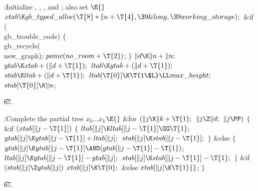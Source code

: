 \B{}:Initialize , , , and ; also set \X${}\E{}$\6
$\\{xtab}\K\\{gb\_typed\_alloc}(\T{8}*\|n+\T{4},\39\&{long},\39\\{working%
\_storage});{}$\6
\&{if} (\\{gb\_trouble\_code})\5
${}\{{}$\1\6
\\{gb\_recycle}(\\{new\_graph});\5
${}\\{panic}(\\{no\_room}+\T{2}){}$;\5
${}\}{}$\2\6
${}\|d\K\|n+\|n;{}$\6
${}\\{ytab}\K\\{xtab}+(\|d+\T{1});{}$\6
${}\\{ltab}\K\\{ytab}+(\|d+\T{1});{}$\6
${}\\{stab}\K\\{ltab}+(\|d+\T{1});{}$\6
${}\\{ltab}[\T{0}]\K\T{1\$L}\LL\\{max\_height};{}$\6
${}\\{stab}[\T{0}]\K\|n{}$;\par
\U67.\fi

\B{}:Complete the partial tree $x_0\ldots x_k$\X${}\E{}$\6
\&{for} ${}(\|j\K\|k+\T{1};{}$ ${}\|j\Z\|d;{}$ ${}\|j\PP){}$\5
${}\{{}$\1\6
\&{if} ${}(\\{xtab}[\|j-\T{1}]){}$\5
${}\{{}$\1\6
${}\\{ltab}[\|j]\K\\{ltab}[\|j-\T{1}]\GG\T{1};{}$\6
${}\\{ytab}[\|j]\K\\{ytab}[\|j-\T{1}]+\\{ltab}[\|j];{}$\6
${}\\{stab}[\|j]\K\\{stab}[\|j-\T{1}];{}$\6
\4${}\}{}$\5
\2\&{else}\5
${}\{{}$\1\6
${}\\{ytab}[\|j]\K\\{ytab}[\|j-\T{1}]\AND(\\{ytab}[\|j-\T{1}]-\T{1}){}$;\6
${}\\{ltab}[\|j]\K\\{ytab}[\|j-\T{1}]-\\{ytab}[\|j];{}$\6
${}\\{stab}[\|j]\K\\{stab}[\|j-\T{1}]-\T{1};{}$\6
\4${}\}{}$\2\6
\&{if} ${}(\\{stab}[\|j]\Z\\{ytab}[\|j]){}$\1\5
${}\\{xtab}[\|j]\K\T{0};{}$\2\6
\&{else}\1\5
${}\\{xtab}[\|j]\K\T{1}{}$;\2\6
\4${}\}{}$\2\par
\U67.\fi

